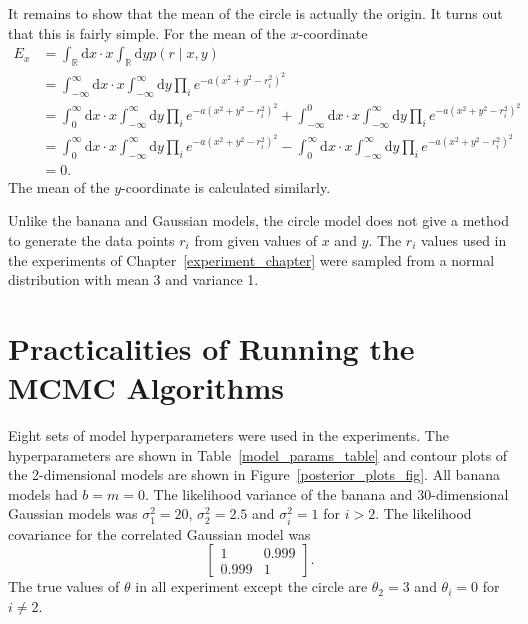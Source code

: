 \documentclass[english,twoside,openright]{HYgraduMLDS}
\newcommand{\R}{\mathbb{R}}
\newcommand{\dx}{\mathrm{d}}
\begin{document}
It remains to show that the mean of the circle is actually the origin. It turns
out that this is fairly simple. For the mean of the \(x\)-coordinate
\begin{align*}
  E_{x} &= \int_{\R}\dx x\cdot x\int_{\R} \dx y p(r\mid x, y)
  \\&= \int_{-\infty}^{\infty}\dx x\cdot x\int_{-\infty}^{\infty}\dx y
  \prod_{i} e^{-a(x^{2} + y^{2} - r_{i}^{2})^{2}}
  \\&= \int_{0}^{\infty}\dx x\cdot x\int_{-\infty}^{\infty}\dx y
  \prod_{i} e^{-a(x^{2} + y^{2} - r_{i}^{2})^{2}}
  + \int_{-\infty}^{0}\dx x\cdot x\int_{-\infty}^{\infty}\dx y
  \prod_{i} e^{-a(x^{2} + y^{2} - r_{i}^{2})^{2}}
  \\&= \int_{0}^{\infty}\dx x\cdot x\int_{-\infty}^{\infty}\dx y
  \prod_{i} e^{-a(x^{2} + y^{2} - r_{i}^{2})^{2}}
  - \int_{0}^{\infty}\dx x\cdot x\int_{-\infty}^{\infty}\dx y
  \prod_{i} e^{-a(x^{2} + y^{2} - r_{i}^{2})^{2}}
  \\&= 0.
\end{align*}
The mean of the \(y\)-coordinate is calculated similarly.

Unlike the banana and Gaussian models,
the circle model does not give a method to generate the data points
\(r_{i}\) from given values of \(x\) and \(y\). The \(r_{i}\) values used
in the experiments of Chapter~\ref{experiment_chapter} were sampled
from a normal distribution with mean 3 and variance 1.

\section{Practicalities of Running the MCMC Algorithms}\label{practical_section}

Eight sets of model hyperparameters were used in the experiments.
The hyperparameters are shown in
Table~\ref{model_params_table} and contour plots of the
2-dimensional models are shown in Figure~\ref{posterior_plots_fig}.
All banana models had \(b = m = 0\). The likelihood variance of the banana
and 30-dimensional Gaussian
models was \(\sigma_{1}^{2} = 20\), \(\sigma_{2}^{2} = 2.5\) and
\(\sigma_{i}^{2} = 1\)
for \(i > 2\). The likelihood covariance for the correlated Gaussian model
was
\[
\begin{bmatrix}
  1 & 0.999 \\
  0.999 & 1
\end{bmatrix}.
\]
The true values of \(\theta\) in all experiment except the circle are
\(\theta_{2} = 3\) and \(\theta_{i} = 0\) for \(i \neq 2\).
\end{document}
